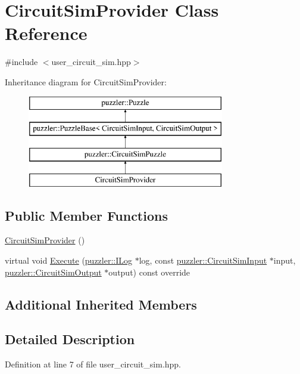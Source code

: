 \hypertarget{a00005}{}\section{Circuit\+Sim\+Provider Class Reference}
\label{a00005}


{\ttfamily \#include $<$user\+\_\+circuit\+\_\+sim.\+hpp$>$}

Inheritance diagram for Circuit\+Sim\+Provider\+:\begin{figure}[H]
\begin{center}
\leavevmode
\includegraphics[height=4.000000cm]{a00005}
\end{center}
\end{figure}
\subsection*{Public Member Functions}
\begin{DoxyCompactItemize}
\item 
\hyperlink{a00005_a74a98370b2d2e464e6a6e4df108f20d3}{Circuit\+Sim\+Provider} ()
\item 
virtual void \hyperlink{a00005_a8831fce573e4692945030b086b7ef933}{Execute} (\hyperlink{a00008}{puzzler\+::\+I\+Log} $\ast$log, const \hyperlink{a00003}{puzzler\+::\+Circuit\+Sim\+Input} $\ast$input, \hyperlink{a00004}{puzzler\+::\+Circuit\+Sim\+Output} $\ast$output) const override
\end{DoxyCompactItemize}
\subsection*{Additional Inherited Members}


\subsection{Detailed Description}


Definition at line 7 of file user\+\_\+circuit\+\_\+sim.\+hpp.



